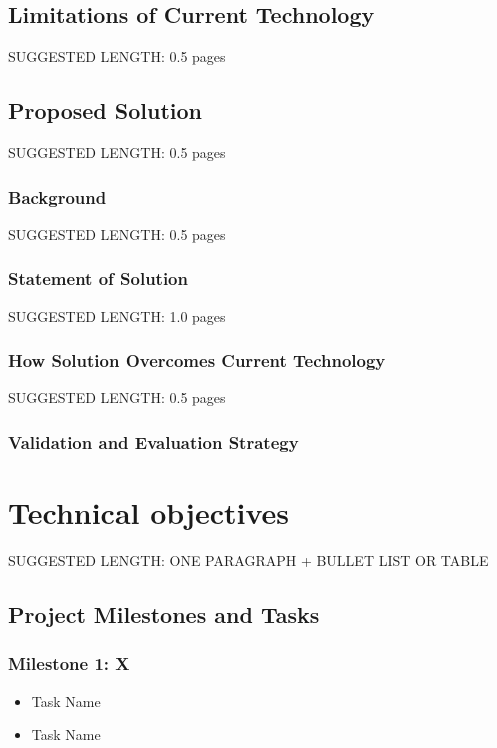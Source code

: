 \documentclass[12pt]{article}
\begin{document}
    \subsection{Limitations of Current Technology}\label{Limitations of Current Technology}
        \colorbox{BurntOrange}{SUGGESTED LENGTH: 0.5 pages}
    
    \subsection{Proposed Solution}\label{Proposed Solution}
        \colorbox{BurntOrange}{SUGGESTED LENGTH: 0.5 pages}
    
    \subsubsection{Background}\label{ Proposed Solution Background}
        \colorbox{BurntOrange}{SUGGESTED LENGTH: 0.5 pages}

    \subsubsection{Statement of Solution}\label{Statement of Solution}
        \colorbox{BurntOrange}{SUGGESTED LENGTH: 1.0 pages}

    \subsubsection{How Solution Overcomes Current Technology}\label{How Solution Overcomes Current Technology}
        \colorbox{BurntOrange}{SUGGESTED LENGTH: 0.5 pages}

    \subsubsection{Validation and Evaluation Strategy}\label{Validation and Evaluation Strategy}

\section{Technical objectives}\label{Technical objectives}
    \colorbox{BurntOrange}{SUGGESTED LENGTH: ONE PARAGRAPH + BULLET LIST OR TABLE}


\subsection{Project Milestones and Tasks}
\subsubsection{Milestone 1: X}
\begin{itemize}
    \item Task Name
    \item Task Name
\end{itemize}
\end{document}
